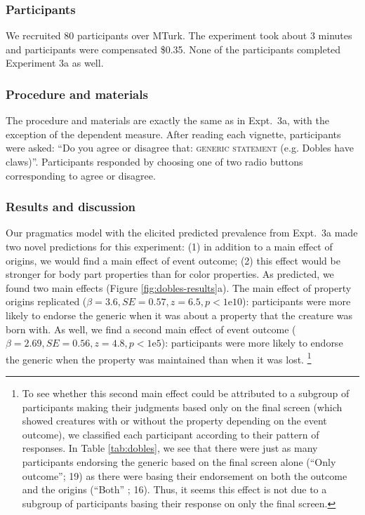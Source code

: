 \documentclass[12pt,letterpaper]{article}
\begin{document}
\subsubsection*{Participants}
We recruited 80 participants over MTurk.  
The experiment took about 3 minutes and participants were compensated \$0.35.
None of the participants completed Experiment 3a as well.

\subsubsection*{Procedure and materials}
The procedure and materials are exactly the same as in Expt.~3a, with the exception of the dependent measure.
After reading each vignette, participants were asked: ``Do you agree or disagree that: \textsc{generic statement} (e.g. Dobles have claws)''.
Participants responded by choosing one of two radio buttons corresponding to agree or disagree.

\subsubsection*{Results and discussion}


Our pragmatics model with the elicited predicted prevalence from Expt.~3a made two novel predictions for this experiment: (1) in addition to a main effect of origins, we would find a main effect of event outcome; (2) this effect would be stronger for body part properties than for color properties.
As predicted, we found two main effects (Figure \ref{fig:dobles-results}a).
The main effect of property origins replicated ($\beta=3.6, SE=0.57, z=6.5, p<1\text{e}10$): participants were more likely to endorse the generic when it was about a property that the creature was born with.
As well, we find a second main effect of event outcome 
 ($\beta = 2.69, SE = 0.56, z=4.8, p<1\text{e}5$): participants were more likely to endorse the generic when the property was maintained than when it was lost.
\footnote{To see whether this second main effect could be attributed to a subgroup of participants making their judgments based only on the final screen (which showed creatures with or without the property depending on  the event outcome), we classified each participant according to their pattern of responses. 
In Table \ref{tab:dobles}, we see that there were just as many participants endorsing the generic based on the final screen alone (``Only outcome''; 19) as there were basing their endorsement on both the outcome and the origins (``Both'' ; 16).
Thus, it seems this effect is not due to a subgroup of participants  basing their response on only the final screen.}
\end{document}
